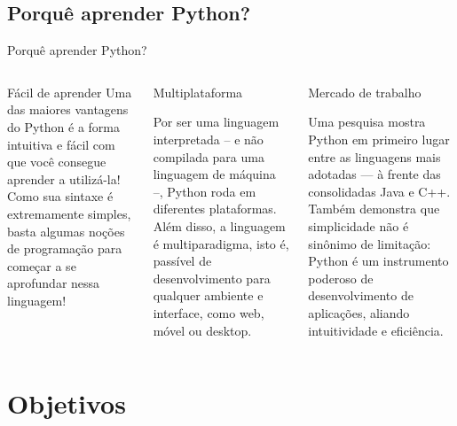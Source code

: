 \subsection{Porquê aprender Python?}
	\begin{frame}{Porquê aprender Python?}
		\begin{columns}
			
				\centering
				\begin{block}{\centering Fácil de aprender}
					\justifying
					\tiny Uma das maiores vantagens do Python é a forma intuitiva e fácil com que você consegue aprender a utilizá-la! Como sua sintaxe é extremamente simples, basta algumas noções de programação para começar a se aprofundar nessa linguagem!
				\end{block}
				
				\pause
				
				\begin{block}{\centering Multiplataforma}
					
					\justifying
					\tiny Por ser uma linguagem interpretada -- e não compilada para uma linguagem de máquina --, Python roda em diferentes plataformas. Além disso, a linguagem é multiparadigma, isto é, passível de desenvolvimento para qualquer ambiente e interface, como web, móvel ou desktop.
				\end{block}
			
				\pause
				\begin{block}{\centering Mercado de trabalho}
					
					\justifying
					\tiny Uma pesquisa mostra Python em primeiro lugar entre as linguagens mais adotadas — à frente das consolidadas Java e C++. Também demonstra que simplicidade não é sinônimo de limitação: Python é um instrumento poderoso de desenvolvimento de aplicações, aliando intuitividade e eficiência.
				\end{block}
					
		\end{columns}
	\end{frame}


\section{Objetivos}
